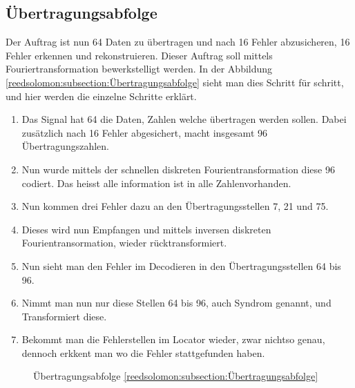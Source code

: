 \subsection{Übertragungsabfolge
\label{reedsolomon:subsection:Übertragungsabfolge}}
Der Auftrag ist nun 64 Daten zu übertragen und nach 16 Fehler abzusicheren,
16 Fehler erkennen und rekonstruieren. 
Dieser Auftrag soll mittels Fouriertransformation bewerkstelligt werden. 
In der Abbildung \ref{reedsolomon:subsection:Übertragungsabfolge} sieht man dies Schritt für schritt,
und hier werden die einzelne Schritte erklärt.
\begin{enumerate}[(1)]
\item Das Signal hat 64 die Daten, Zahlen welche übertragen werden sollen. 
Dabei zusätzlich nach 16 Fehler abgesichert, macht insgesamt 96 Übertragungszahlen.
\item Nun wurde mittels der schnellen diskreten Fourientransformation diese 96 codiert.
Das heisst alle information ist in alle Zahlenvorhanden.
\item Nun kommen drei Fehler dazu an den Übertragungsstellen 7, 21 und 75.
\item Dieses wird nun Empfangen und mittels inversen diskreten Fourientransormation, wieder rücktransformiert.
\item Nun sieht man den Fehler im Decodieren in den Übertragungsstellen 64 bis 96.
\item Nimmt man nun nur diese Stellen 64 bis 96, auch Syndrom genannt, und Transformiert diese.
\item Bekommt man die Fehlerstellen im Locator wieder, zwar nichtso genau, dennoch erkkent man wo die Fehler stattgefunden haben.
\end{enumerate}

\begin{figure}
	\centering
	\caption{Übertragungsabfolge \ref{reedsolomon:subsection:Übertragungsabfolge}}
	\label{fig:sendorder}
\end{figure}